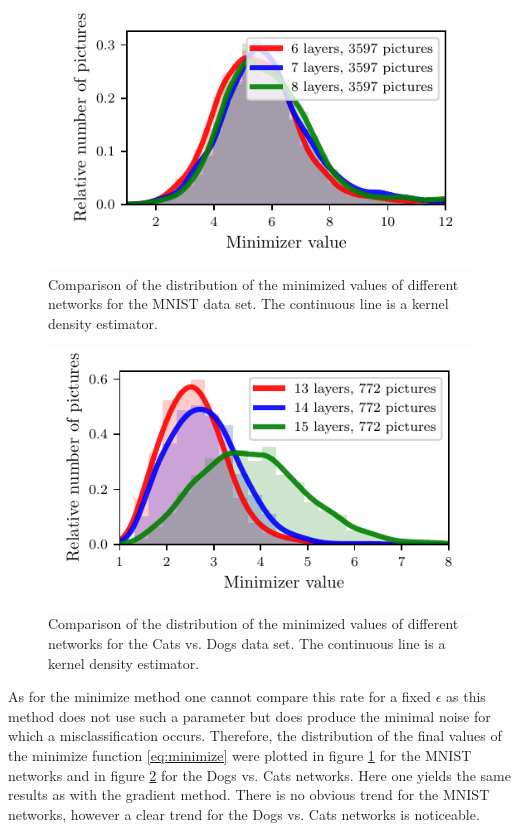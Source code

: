 \documentclass[%
 reprint,
 amsmath,amssymb,
 aps,
]{revtex4-1}
\begin{document}
\begin{figure}
\centering
\showthe\columnwidth
\includegraphics[width = 1\linewidth]{figures/plot_mnist_robustness_minimizer.pdf}
\caption{Comparison of the distribution of the minimized values of different networks for the MNIST data set. The continuous line is a kernel density estimator.}
\label{fig:comp_min_mnist}
\end{figure}

\begin{figure}
\centering
\showthe\columnwidth
\includegraphics[width = 1\linewidth]{figures/plot_cats_vs_dogs_robustness_minimizer.pdf}
\caption{Comparison of the distribution of the minimized values of different networks for the Cats vs. Dogs data set. The continuous line is a kernel density estimator.}
\label{fig:comp_min_cats_vs_dogs}
\end{figure}

As for the minimize method one cannot compare this rate for a fixed $\epsilon$ as this method does not use such a parameter but does produce the minimal noise for which a misclassification occurs. Therefore, the distribution of the final values of the minimize function \eqref{eq:minimize} were plotted in figure \ref{fig:comp_min_mnist} for the MNIST networks and in figure \ref{fig:comp_min_cats_vs_dogs} for the Dogs vs. Cats networks. Here one yields the same results as with the gradient method. There is no obvious trend for the MNIST networks, however a clear trend for the Dogs vs. Cats networks is noticeable.\\
\end{document}
